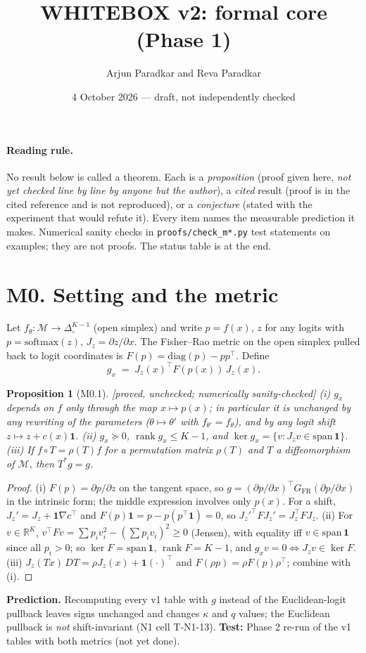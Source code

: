 \documentclass[11pt]{article}
\title{WHITEBOX v2: formal core (Phase 1)}
\author{Arjun Paradkar and Reva Paradkar}
\date{4 October 2026 --- draft, not independently checked}
\newtheorem{prop}{Proposition}
\theoremstyle{remark}\newtheorem{rem}{Remark}
\newcommand{\R}{\mathbb R}\newcommand{\Z}{\mathbb Z}
\newcommand{\FR}{\mathrm{FR}}\newcommand{\tr}{\operatorname{tr}}
\newcommand{\status}[1]{\hfill\textsf{[#1]}}
\begin{document}
\maketitle

\paragraph{Reading rule.} No result below is called a theorem. Each is a \emph{proposition} (proof given here, \emph{not yet checked line by line by anyone but the author}), a \emph{cited} result (proof is in the cited reference and is not reproduced), or a \emph{conjecture} (stated with the experiment that would refute it). Every item names the measurable prediction it makes. Numerical sanity checks in \texttt{proofs/check\_m*.py} test statements on examples; they are not proofs. The status table is at the end.

\section*{M0. Setting and the metric}
Let $f_\theta:\mathcal M\to\Delta^{K-1}_\circ$ (open simplex) and write $p=f(x)$, $z$ for any logits with $p=\mathrm{softmax}(z)$, $J_z=\partial z/\partial x$. The Fisher--Rao metric on the open simplex pulled back to logit coordinates is $F(p)=\mathrm{diag}(p)-pp^\top$. Define
\[ g_x \;=\; J_z(x)^\top F(p(x))\,J_z(x). \]
\begin{prop}[M0.1]\status{proved, unchecked; numerically sanity-checked}
(i) $g_x$ depends on $f$ only through the map $x\mapsto p(x)$; in particular it is unchanged by any rewriting of the parameters ($\theta\mapsto\theta'$ with $f_{\theta'}=f_\theta$), and by any logit shift $z\mapsto z+c(x)\mathbf 1$.
(ii) $g_x\succeq0$, $\operatorname{rank}g_x\le K-1$, and $\ker g_x=\{v: J_zv\in\mathrm{span}\,\mathbf 1\}$.
(iii) If $f\circ T=\rho(T)f$ for a permutation matrix $\rho(T)$ and $T$ a diffeomorphism of $\mathcal M$, then $T^*g=g$.
\end{prop}
\begin{proof}
(i) $F(p)=\partial p/\partial z$ on the tangent space, so $g=(\partial p/\partial x)^\top G_{\FR}(\partial p/\partial x)$ in the intrinsic form; the middle expression involves only $p(x)$. For a shift, $J_z'=J_z+\mathbf 1\nabla c^\top$ and $F(p)\mathbf 1=p-p(p^\top\mathbf 1)=0$, so $J_z'^\top FJ_z'=J_z^\top FJ_z$. (ii) For $v\in\R^K$, $v^\top Fv=\sum p_iv_i^2-(\sum p_iv_i)^2\ge0$ (Jensen), with equality iff $v\in\mathrm{span}\,\mathbf 1$ since all $p_i>0$; so $\ker F=\mathrm{span}\,\mathbf 1$, $\operatorname{rank}F=K-1$, and $g_xv=0\iff J_zv\in\ker F$. (iii) $J_z(Tx)\,DT=\rho J_z(x)+\mathbf 1(\cdot)^\top$ and $F(\rho p)=\rho F(p)\rho^\top$; combine with (i). \qedhere
\end{proof}
\textbf{Prediction.} Recomputing every v1 table with $g$ instead of the Euclidean-logit pullback leaves signs unchanged and changes $\kappa$ and $q$ values; the Euclidean pullback is \emph{not} shift-invariant (N1 cell T-N1-13). \textbf{Test:} Phase 2 re-run of the v1 tables with both metrics (not yet done).
\end{document}
